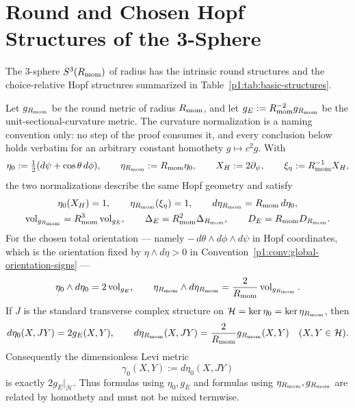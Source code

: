 \documentclass[11pt]{article}
\begin{document}
\section{Round and Chosen Hopf Structures of the 3-Sphere}
\label{p1:sec:canonical-structures}

The 3-sphere $S^3(R_{\mathrm{mom}})$ of radius \Rmom has the intrinsic round structures
and the choice-relative Hopf structures summarized in
Table~\ref{p1:tab:basic-structures}.

\begin{proposition}
\label{p1:prop:hopf-scale-dictionary}
Let \(g_{R_{\mathrm{mom}}}\) be the round metric of radius \(R_{\mathrm{mom}}\), and let
\(g_E:=R_{\mathrm{mom}}^{-2}g_{R_{\mathrm{mom}}}\) be the unit-sectional-curvature metric.  The
curvature normalization is a naming convention only: no step of the proof
consumes it, and every conclusion below holds verbatim for an arbitrary
constant homothety \(g\mapsto c^2g\).  With
\[
  \eta_0:=\tfrac12(d\psi+\cos\theta\,d\phi),
  \qquad
  \eta_{R_{\mathrm{mom}}}:=R_{\mathrm{mom}}\eta_0,
  \qquad
  X_H:=2\partial_\psi,
  \qquad
  \xi_\eta:=R_{\mathrm{mom}}^{-1}X_H,
\]
the two normalizations describe the same Hopf geometry and satisfy
\[
\begin{gathered}
  \eta_0(X_H)=1,
  \qquad
  \eta_{R_{\mathrm{mom}}}(\xi_\eta)=1,
  \qquad
  d\eta_{R_{\mathrm{mom}}}=R_{\mathrm{mom}}\,d\eta_0,\\
  \operatorname{vol}_{g_{R_{\mathrm{mom}}}}=R_{\mathrm{mom}}^3\operatorname{vol}_{g_E},
  \qquad
  \Delta_E=R_{\mathrm{mom}}^2\Delta_{R_{\mathrm{mom}}},
  \qquad
  D_E=R_{\mathrm{mom}} D_{R_{\mathrm{mom}}}.
\end{gathered}
\]
For the chosen total orientation --- namely
\(-\,d\theta\wedge d\phi\wedge d\psi\) in Hopf coordinates, which is the
orientation fixed by \(\eta\wedge d\eta>0\) in
Convention~\ref{p1:conv:global-orientation-signs} ---
\[
  \eta_0\wedge d\eta_0=2\operatorname{vol}_{g_E},
  \qquad
  \eta_{R_{\mathrm{mom}}}\wedge d\eta_{R_{\mathrm{mom}}}
  =\frac{2}{R_{\mathrm{mom}}}\operatorname{vol}_{g_{R_{\mathrm{mom}}}}.
\]
If \(J\) is the standard transverse complex structure on
\(\mathcal H=\ker\eta_0=\ker\eta_{R_{\mathrm{mom}}}\), then
\[
  d\eta_0(X,JY)=2g_E(X,Y),
  \qquad
  d\eta_{R_{\mathrm{mom}}}(X,JY)=\frac{2}{R_{\mathrm{mom}}}g_{R_{\mathrm{mom}}}(X,Y)
  \quad (X,Y\in\mathcal H).
\]
Consequently the dimensionless Levi metric
\[
  \gamma_0(X,Y):=d\eta_0(X,JY)
\]
is exactly \(2g_E|_{\mathcal H}\).  Thus formulas using
\(\eta_0,g_E\) and formulas using \(\eta_{R_{\mathrm{mom}}},g_{R_{\mathrm{mom}}}\) are related by
homothety and must not be mixed termwise.
\end{proposition}
\end{document}
